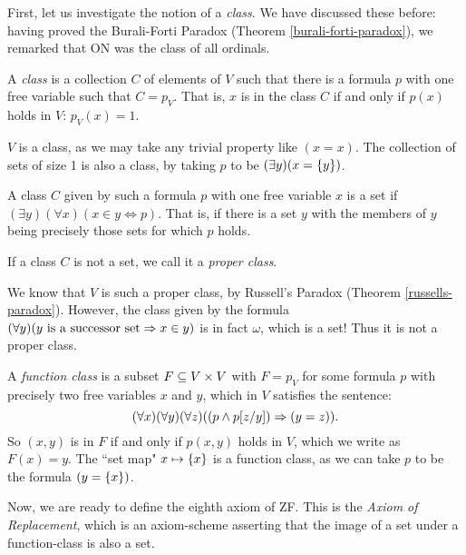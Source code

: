 \documentclass{article}
\begin{document}
First, let us investigate the notion of a \textit{class}. We have discussed these before: having proved the Burali-Forti Paradox (Theorem \ref{burali-forti-paradox}), we remarked that ON was the class of all ordinals.

\begin{definition}[Class]
	A \textit{class} is a collection $C$ of elements of $V$ such that there is a formula $p$ with one free variable such that $C = p_V$. That is, $x$ is in the class $C$ if and only if $p(x)$ holds in $V$: $p_V(x) = 1$.
\end{definition}

\begin{corollary}
    $V$ is a class, as we may take any trivial property like $(x = x)$. The collection of sets of size 1 is also a class, by taking $p$ to be $(\exists y)(x = \left\lbrace y \right\rbrace)$.
\end{corollary}

\begin{definition}
    A class $C$ given by such a formula $p$ with one free variable $x$ is a set if $(\exists y)(\forall x)(x \in y \Leftrightarrow p)$. That is, if there is a set $y$ with the members of $y$ being precisely those sets for which $p$ holds.
	
	If a class $C$ is not a set, we call it a \textit{proper class}.
\end{definition}

\begin{corollary}
    We know that $V$ is such a proper class, by Russell's Paradox (Theorem \ref{russells-paradox}).
	However, the class given by the formula $(\forall y)(y \text{ is a successor set} \Rightarrow x \in y)$ is in fact $\omega$, which is a set! Thus it is not a proper class.
\end{corollary}

\begin{definition}
    A \textit{function class} is a subset $F \subseteq V \times V$ with $F = p_V$ for some formula $p$ with precisely two free variables $x$ and $y$, which in $V$ satisfies the sentence:
    \[
	(\forall x)(\forall y)(\forall z)((p \land p[z/y]) \Rightarrow (y = z)).
	\]
	So $(x, y)$ is in $F$ if and only if $p(x, y)$ holds in $V$, which we write as $F(x) = y$. The ``set map" $x \mapsto \left\lbrace x \right\rbrace$ is a function class, as we can take $p$ to be the formula $(y = \left\lbrace x \right\rbrace)$.
\end{definition}

Now, we are ready to define the eighth axiom of ZF. This is the \textit{Axiom of Replacement}, which is an axiom-scheme asserting that the image of a set under a function-class is also a set.
\end{document}
